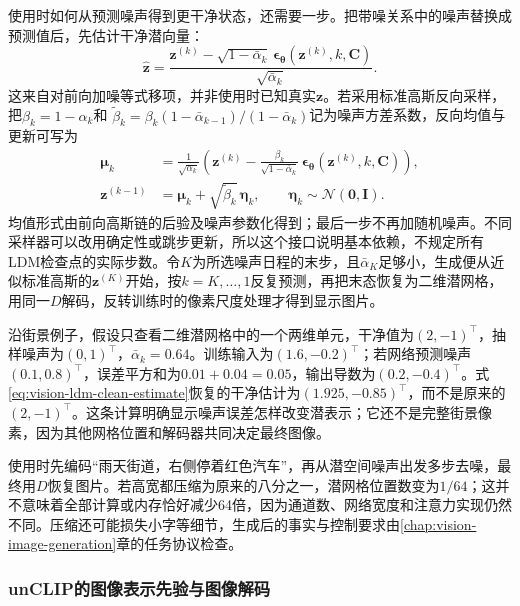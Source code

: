 使用时如何从预测噪声得到更干净状态，还需要一步。把带噪关系中的噪声替换成预测值后，先估计干净潜向量：
\begin{equation}
  \widehat{\bm z}
   =\frac{\bm z^{(k)}
       -\sqrt{1-\bar\alpha_k}\,
           \bm\epsilon_{\bm\theta}(\bm z^{(k)},k,\bm C)}
          {\sqrt{\bar\alpha_k}}.
  \label{eq:vision-ldm-clean-estimate}
\end{equation}
这来自对前向加噪等式移项，并非使用时已知真实$\bm z$。若采用标准高斯反向采样，把$\beta_k=1-\alpha_k$和
$\widetilde\beta_k=\beta_k(1-\bar\alpha_{k-1})/(1-\bar\alpha_k)$记为噪声方差系数，反向均值与更新可写为
\begin{equation}
  \begin{aligned}
    \bm\mu_k
      &=\frac1{\sqrt{\alpha_k}}
        \left(\bm z^{(k)}
          -\frac{\beta_k}{\sqrt{1-\bar\alpha_k}}\,
             \bm\epsilon_{\bm\theta}(\bm z^{(k)},k,\bm C)\right),\\
    \bm z^{(k-1)}
      &=\bm\mu_k+\sqrt{\widetilde\beta_k}\,\bm\eta_k,
         \qquad \bm\eta_k\sim\mathcal N(\bm0,\bm I).
  \end{aligned}
  \label{eq:vision-ldm-reverse-interface}
\end{equation}
均值形式由前向高斯链的后验及噪声参数化得到；最后一步不再加随机噪声。不同采样器可以改用确定性或跳步更新，所以这个接口说明基本依赖，不规定所有LDM检查点的实际步数。令$K$为所选噪声日程的末步，且$\bar\alpha_K$足够小，生成便从近似标准高斯的$\bm z^{(K)}$开始，按$k=K,\ldots,1$反复预测，再把末态恢复为二维潜网格，用同一$D$解码，反转训练时的像素尺度处理才得到显示图片。

沿街景例子，假设只查看二维潜网格中的一个两维单元，干净值为$(2,-1)^\top$，抽样噪声为$(0,1)^\top$，$\bar\alpha_k=0.64$。训练输入为$(1.6,-0.2)^\top$；若网络预测噪声$(0.1,0.8)^\top$，误差平方和为$0.01+0.04=0.05$，输出导数为$(0.2,-0.4)^\top$。式\eqref{eq:vision-ldm-clean-estimate}恢复的干净估计为$(1.925,-0.85)^\top$，而不是原来的$(2,-1)^\top$。这条计算明确显示噪声误差怎样改变潜表示；它还不是完整街景像素，因为其他网格位置和解码器共同决定最终图像。

使用时先编码“雨天街道，右侧停着红色汽车”，再从潜空间噪声出发多步去噪，最终用$D$恢复图片。若高宽都压缩为原来的八分之一，潜网格位置数变为$1/64$；这并不意味着全部计算或内存恰好减少64倍，因为通道数、网络宽度和注意力实现仍然不同。压缩还可能损失小字等细节，生成后的事实与控制要求由\ref{chap:vision-image-generation}章的任务协议检查。

\subsubsection{unCLIP的图像表示先验与图像解码}
\label{sec:vision-models-unclip}

